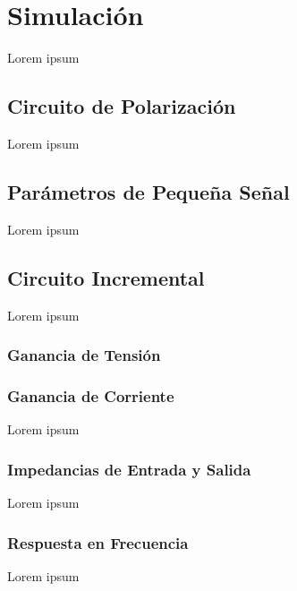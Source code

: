 \chapter{Simulación}
Lorem ipsum
\section{Circuito de Polarización}
Lorem ipsum
\section{Parámetros de Pequeña Señal}
Lorem ipsum
\section{Circuito Incremental}
Lorem ipsum
\subsection{Ganancia de Tensión}
\subsection{Ganancia de Corriente}
Lorem ipsum
\subsection{Impedancias de Entrada y Salida}
Lorem ipsum
\subsection{Respuesta en Frecuencia}
Lorem ipsum